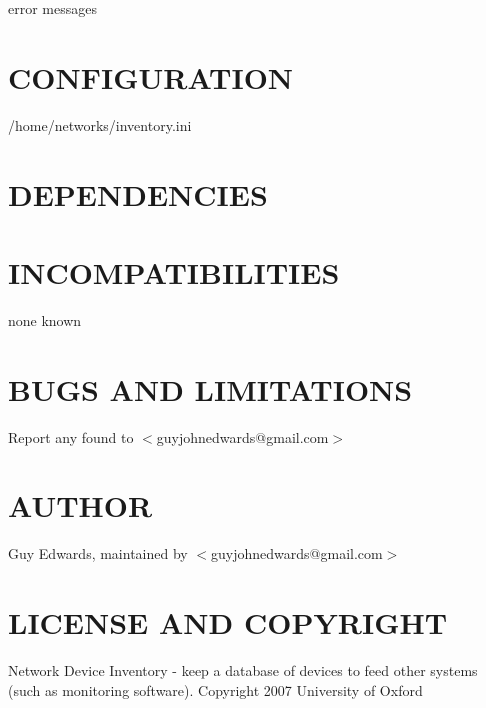 \documentclass{book}
\begin{document}
error messages


\section{CONFIGURATION}
\label{_CONFIGURATION}
\hypertarget{_CONFIGURATION}{}



/home/networks/inventory.ini


\section{DEPENDENCIES}
\label{_DEPENDENCIES}
\hypertarget{_DEPENDENCIES}{}


\section{INCOMPATIBILITIES}
\label{_INCOMPATIBILITIES}
\hypertarget{_INCOMPATIBILITIES}{}



none known


\section{BUGS AND LIMITATIONS}
\label{_BUGS_AND_LIMITATIONS}
\hypertarget{_BUGS_AND_LIMITATIONS}{}



Report any found to $<$guyjohnedwards@gmail.com$>$


\section{AUTHOR}
\label{_AUTHOR}
\hypertarget{_AUTHOR}{}



Guy Edwards, maintained by $<$guyjohnedwards@gmail.com$>$


\section{LICENSE AND COPYRIGHT}
\label{_LICENSE_AND_COPYRIGHT}
\hypertarget{_LICENSE_AND_COPYRIGHT}{}



Network Device Inventory - keep a database of devices to feed other systems (such as monitoring software). Copyright 2007 University of Oxford
\end{document}
